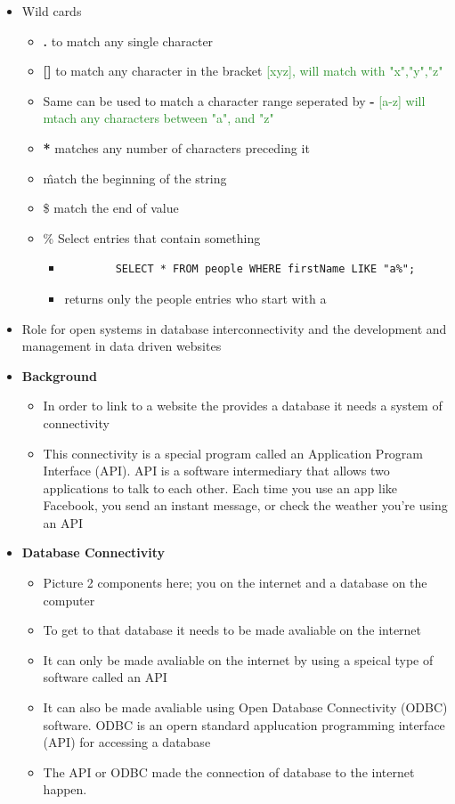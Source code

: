 \documentclass[12pt, a4, twoside]{article}
\begin{document}
\begin{itemize}
  \item Wild cards 
  \begin{itemize}
    \item \textbf{.} to match any single character 
    \item \textbf{[]} to match any character in the bracket \textcolor{ForestGreen}{[xyz], will match with "x","y","z"}
    \item Same can be used to match a character range seperated by \textbf{-} \textcolor{ForestGreen}{[a-z] will mtach any characters between "a", and "z"}
    \item \textbf{*} matches any number of characters preceding it 
    \item \^ match the beginning of the string 
    \item \$ match the end of value
    \item \% Select entries that contain something 
    \begin{itemize}
      \item {\begin{verbatim}
        SELECT * FROM people WHERE firstName LIKE "a%";
      \end{verbatim}}
      \item returns only the people entries who start with a
    \end{itemize}
  \end{itemize}
  \item Role for open systems in database interconnectivity and the development and management in data driven websites 
  \item \textbf{Background}
  \begin{itemize}
    \item In order to link to a website the provides a database it needs a system of connectivity 
    \item This connectivity is a special program called an Application Program Interface (API). API is a software intermediary that allows two applications to talk to each other. Each time you use an app like Facebook, you send an instant message, or check the weather you're using an API
  \end{itemize}
  \item \textbf{Database Connectivity}
  \begin{itemize}
    \item Picture 2 components here; you on the internet and a database on the computer
    \item To get to that database it needs to be made avaliable on the internet
    \item It can only be made avaliable on the internet by using a speical type of software called an API
    \item It can also be made avaliable using Open Database Connectivity (ODBC) software. ODBC is an opern standard applucation programming interface (API) for accessing a database 
    \item The API or ODBC made the connection of database to the internet happen.
  \end{itemize}
\end{itemize}
\end{document}
